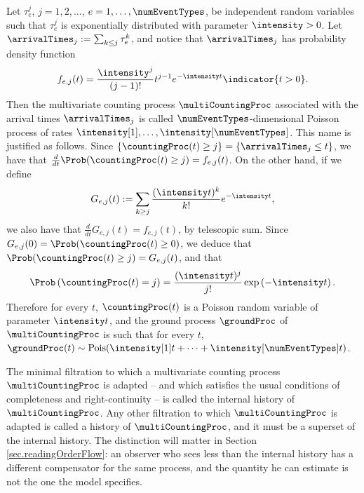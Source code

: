 \begin{example}
 Let $\tau_e^j$, $j = 1,2,\dots$, $e = 1,\dots, \numEventTypes$, be independent random variables
 such that $\tau_e^j$ is exponentially distributed with parameter $\intensity>0$.
 Let $\arrivalTimes_{j} := \sum_{k\leq j} \tau_e^{k}$,
 and notice that $\arrivalTimes_{j}$ has probability density function
 \begin{equation*}
  f_{e,j}(t) = \frac{\intensity^j}{(j-1)!}t^{j-1} e^{-\intensity t} \indicator{t>0}.
 \end{equation*}
 Then the multivariate counting process $\multiCountingProc$ associated with the arrival times
 $\arrivalTimes_{j}$ is called $\numEventTypes$-dimensional Poisson process of rates
 $\intensity[1], \dots, \intensity[\numEventTypes]$.
 This name is justified as follows.
 Since $\lbrace \countingProc(t)\geq j\rbrace = \lbrace \arrivalTimes_{j} \leq t\rbrace$,
 we have that $\frac{d}{dt} \Prob(\countingProc(t) \geq j) = f_{e,j} (t)$.
 On the other hand, if we define
 \begin{equation*}
  G_{e,j}(t) := \sum_{k\geq j} \frac{(\intensity t)^k}{k!}e^{-\intensity t},
 \end{equation*}
 we also have that $\frac{d}{dt} G_{e,j}(t) = f_{e,j}(t)$, by telescopic sum.
 Since $G_{e,j}(0) = \Prob (\countingProc(t)\geq 0)$,
 we deduce that $\Prob(\countingProc(t) \geq j) = G_{e,j}(t)$, and that
 \begin{equation*}
  \Prob\left( \countingProc(t) = j\right) =
  \frac{(\intensity t)^j}{j!} \exp\left( -\intensity t\right).
 \end{equation*}
 Therefore for every $t$, $\countingProc(t)$ is a Poisson random variable of parameter
 $\intensity t$,
 and the ground process $\groundProc$ of $\multiCountingProc$ is such that for every $t$,
 $\groundProc(t) \sim \text{Pois}(\intensity[1]t + \dots + \intensity[\numEventTypes]t)$.
\end{example}

The minimal filtration to which a multivariate counting process $\multiCountingProc$ is adapted
-- and which satisfies the usual conditions of completeness and right-continuity --
is called the internal history of $\multiCountingProc$.
Any other filtration to which $\multiCountingProc$ is adapted is called a history of
$\multiCountingProc$, and it must be a superset of the internal history.
The distinction will matter in Section \ref{sec.readingOrderFlow}:
an observer who sees less than the internal history has a different compensator for the same
process, and the quantity he can estimate is not the one the model specifies.

